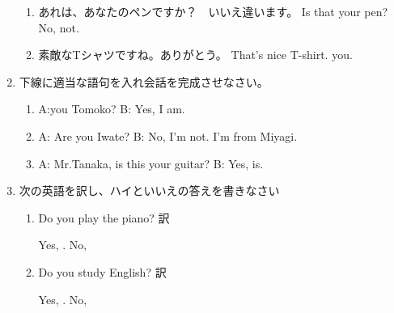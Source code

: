 \documentclass[fleqn]{jsarticle}
\begin{document}
\begin{enumerate}
\begin{enumerate}
      \item あれは、あなたのペンですか？　いいえ違います。 Is that your pen? No, \underline{\hspace{3zw}} not.
      \item 素敵なTシャツですね。ありがとう。 That's nice T-shirt.  \underline{\hspace{3zw}} you.
    \end{enumerate}
  \item 下線に適当な語句を入れ会話を完成させなさい。
    \begin{enumerate}
      \item A:\underline{\hspace{3zw}}you  Tomoko? \hspace{1zw}B: Yes, I am.
      \item A: Are you \underline{\hspace{3zw}}Iwate? \hspace{1zw}B: No, I'm not. I'm from Miyagi.
      \item A: Mr.Tanaka, is this your guitar? \hspace{1zw}B: Yes, \underline{\hspace{3zw}} is.
    \end{enumerate}
  \item 次の英語を訳し、ハイといいえの答えを書きなさい
    \begin{enumerate}
      \item Do you play the piano? 訳\underline{\hspace{6zw}} \par
        Yes, \underline{\hspace{3zw}}. \hspace{1zw} No, \underline{\hspace{3zw}}
      \item Do you study English? 訳\underline{\hspace{6zw}} \par 
        Yes, \underline{\hspace{3zw}}. \hspace{1zw} No, \underline{\hspace{3zw}}
    \end{enumerate}

\end{enumerate}
\end{document}
